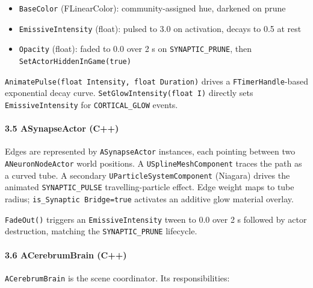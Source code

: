 \begin{itemize}
\item \texttt{BaseColor} (FLinearColor): community-assigned hue, darkened on prune
\item \texttt{EmissiveIntensity} (float): pulsed to 3.0 on activation, decays to 0.5 at rest
\item \texttt{Opacity} (float): faded to 0.0 over 2 s on \texttt{SYNAPTIC\_PRUNE}, then \texttt{SetActorHiddenInGame(true)}

\end{itemize}
\texttt{AnimatePulse(float Intensity, float Duration)} drives a \texttt{FTimerHandle}-based exponential decay curve. \texttt{SetGlowIntensity(float I)} directly sets \texttt{EmissiveIntensity} for \texttt{CORTICAL\_GLOW} events.

\paragraph{3.5 ASynapseActor (C++)}

Edges are represented by \texttt{ASynapseActor} instances, each pointing between two \texttt{ANeuronNodeActor} world positions. A \texttt{USplineMeshComponent} traces the path as a curved tube. A secondary \texttt{UParticleSystemComponent} (Niagara) drives the animated \texttt{SYNAPTIC\_PULSE} travelling-particle effect. Edge weight maps to tube radius; \texttt{is\_Synaptic Bridge=true} activates an additive glow material overlay.

\texttt{FadeOut()} triggers an \texttt{EmissiveIntensity} tween to 0.0 over 2 s followed by actor destruction, matching the \texttt{SYNAPTIC\_PRUNE} lifecycle.

\paragraph{3.6 ACerebrumBrain (C++)}

\texttt{ACerebrumBrain} is the scene coordinator. Its respo\-nsibilities:

